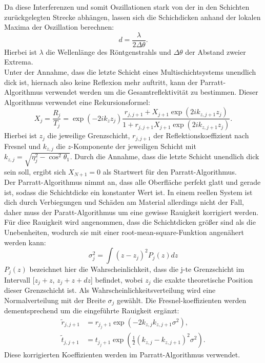 Da diese Interferenzen und somit Oszillationen stark von der in den Schichten zurückgelegten Strecke abhängen, lassen sich die Schichdicken anhand der lokalen Maxima der Oszillation berechnen:
\begin{equation}
    \label{eqn:Schichtdicke}
    d = \frac{\lambda}{2\Delta \theta}.
\end{equation}
Hierbei ist $\lambda$ die Wellenlänge des Röntgenstrahls und $\Delta \theta$ der Abstand zweier Extrema.\\
Unter der Annahme, dass die letzte Schicht eines Multischichtsystems unendlich dick ist, hiernach also keine Reflexion mehr auftritt, kann der Parratt-Algorithmus verwendet werden um die Gesamtreflektivität
zu bestimmen. Dieser Algorithmus verwendet eine Rekursionsformel:
\begin{equation}
    X_j = \frac{R_j}{T_j} = \exp{(-2ik_z  z_j)}\frac{r_{j,j+1}+X_{j+1}\exp{(2ik_{z,j+1}z_j)}}{1+r_{j,j+1}X_{j+1}\exp{(2ik_{z,j+1}z_j)}}.
\end{equation}
Hierbei ist $z_j$ die jeweilige Grenzschicht, $r_{j,j+1}$ der Reflektionskoeffizient nach Fresnel und $k_{z,j}$ die $z$-Komponente der jeweiligen Schicht mit $k_{z,j} = \sqrt{\eta_j^2 - \cos^2{\theta_1}}$. Durch
die Annahme, dass die letzte Schicht unendlich dick sein soll, ergibt sich $X_{N+1} =0$ als Startwert für den Parratt-Algorithmus.\\
Der Parratt-Algorithmus nimmt an, dass alle Oberfläche perfekt glatt und gerade ist, sodass die Schichtdicke ein konstanter Wert ist. In einem reellen System ist dich durch Verbiegungen und Schäden am Material allerdings
nicht der Fall, daher muss der Paratt-Algorithmus um eine gewisse Rauigkeit korrigiert werden. Für diee Rauigkeit wird angenommen, dass die Schichtdicken größer sind als die Unebenheiten, wodurch sie mit 
einer root-mean-square-Funktion angenähert werden kann:
\begin{equation}
    \label{eqn:rauigkeit}
    \sigma_j^2 = \int (z-z_j)^2P_j(z)dz
\end{equation}
$P_j(z)$ bezeichnet hier die Wahrscheinlichkeit, dass die j-te Grenzschicht im Intervall [$z_j+z$, $z_j+z+dz$] befindet, wobei $z_j$ die exakte theoretische Position dieser Grenzschicht ist. Als Wahrscheinlichkeitsverteilung
wird eine Normalverteilung mit der Breite $\sigma_j$ gewählt. Die Fresnel-koeffizienten werden dementsprechend um die eingeführte Rauigkeit ergänzt:
\begin{align}
    \label{eqn:fresnel_ref}
    \tilde{r}_{j,j+1} &= r_{j_j+1} \exp{(-2k_{z,j}k_{z,j+1}\sigma^2)},\\
    \tilde{t}_{j,j+1} &=  t_{j_j+1} \exp{(\frac{1}{2}(k_{z,j}-k_{z,j+1})^2\sigma^2)}.
\end{align}
Diese korrigierten Koeffizienten werden im Parratt-Algorithmus verwendet.

